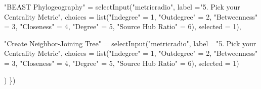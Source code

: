 \documentclass[
]{article}
\newenvironment{Shaded}{\begin{snugshade}}{\end{snugshade}}
\newcommand{\AttributeTok}[1]{\textcolor[rgb]{0.77,0.63,0.00}{#1}}
\newcommand{\DecValTok}[1]{\textcolor[rgb]{0.00,0.00,0.81}{#1}}
\newcommand{\FunctionTok}[1]{\textcolor[rgb]{0.00,0.00,0.00}{#1}}
\newcommand{\NormalTok}[1]{#1}
\newcommand{\OtherTok}[1]{\textcolor[rgb]{0.56,0.35,0.01}{#1}}
\newcommand{\StringTok}[1]{\textcolor[rgb]{0.31,0.60,0.02}{#1}}
\begin{document}
\begin{Shaded}
\begin{Highlighting}[]
           
           \StringTok{"BEAST Phylogeography"} \OtherTok{=} \FunctionTok{selectInput}\NormalTok{(}\StringTok{"metricradio"}\NormalTok{,}
                                                \AttributeTok{label =}\StringTok{"5. Pick your Centrality Metric"}\NormalTok{,}
                                                \AttributeTok{choices =} \FunctionTok{list}\NormalTok{(}\StringTok{"Indegree"} \OtherTok{=} \DecValTok{1}\NormalTok{,}
                                                               \StringTok{"Outdegree"} \OtherTok{=} \DecValTok{2}\NormalTok{,}
                                                               \StringTok{"Betweenness"} \OtherTok{=} \DecValTok{3}\NormalTok{,}
                                                               \StringTok{"Closeness"} \OtherTok{=} \DecValTok{4}\NormalTok{,}
                                                               \StringTok{"Degree"} \OtherTok{=} \DecValTok{5}\NormalTok{,}
                                                               \StringTok{"Source Hub Ratio"} \OtherTok{=} \DecValTok{6}\NormalTok{),}
                                                \AttributeTok{selected =} \DecValTok{1}\NormalTok{),}
           
           \StringTok{"Create Neighbor{-}Joining Tree"} \OtherTok{=} \FunctionTok{selectInput}\NormalTok{(}\StringTok{"metricradio"}\NormalTok{,}
                                                        \AttributeTok{label =}\StringTok{"5. Pick your Centrality Metric"}\NormalTok{,}
                                                        \AttributeTok{choices =} \FunctionTok{list}\NormalTok{(}\StringTok{"Indegree"} \OtherTok{=} \DecValTok{1}\NormalTok{,}
                                                                       \StringTok{"Outdegree"} \OtherTok{=} \DecValTok{2}\NormalTok{,}
                                                                       \StringTok{"Betweenness"} \OtherTok{=} \DecValTok{3}\NormalTok{,}
                                                                       \StringTok{"Closeness"} \OtherTok{=} \DecValTok{4}\NormalTok{,}
                                                                       \StringTok{"Degree"} \OtherTok{=} \DecValTok{5}\NormalTok{,}
                                                                       \StringTok{"Source Hub Ratio"} \OtherTok{=} \DecValTok{6}\NormalTok{),}
                                                        \AttributeTok{selected =} \DecValTok{1}\NormalTok{)}
           
\NormalTok{    )}
\NormalTok{  \})}
  

\end{Highlighting}
\end{Shaded}
\end{document}
